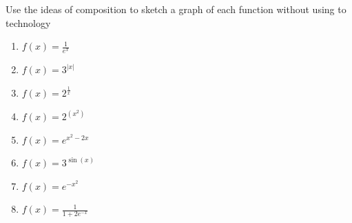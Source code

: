 \documentclass[10pt,]{book}
\theoremstyle{ptxdefinitionnotitle}
\theoremstyle{ptxdefinitiontitle}
\theoremstyle{ptxdefinitionnotitle}
\theoremstyle{ptxdefinitiontitle}
\theoremstyle{ptxdefinitionnotitle}
\theoremstyle{ptxdefinitiontitle}
\numberwithin{equation}{section}
\begin{document}
\begin{divisionexercise}{10}\hypertarget{exercise-71}{}
\hypertarget{p-269}{}%
Use the ideas of composition to sketch a graph of each function without using to technology%
\leavevmode%
\begin{enumerate}[label=(\alph*)]
\item\hypertarget{li-159}{}\(f(x)=\frac{1}{e^x}\)%
\item\hypertarget{li-160}{}\(f(x)=3^{|x|}\)%
\item\hypertarget{li-161}{}\(f(x)=2^{\frac{1}{x}}\)%
\item\hypertarget{li-162}{}\(f(x)=2^{\left(x^2\right)}\)%
\item\hypertarget{li-163}{}\(f(x)=e^{x^2-2x}\)%
\item\hypertarget{li-164}{}\(f(x)=3^{\sin(x)}\)%
\item\hypertarget{li-165}{}\(f(x)=e^{-x^2}\)%
\item\hypertarget{li-166}{}\(f(x)=\frac{1}{1+2e^{-x}}\)%
\end{enumerate}
\end{divisionexercise}%
\end{document}
